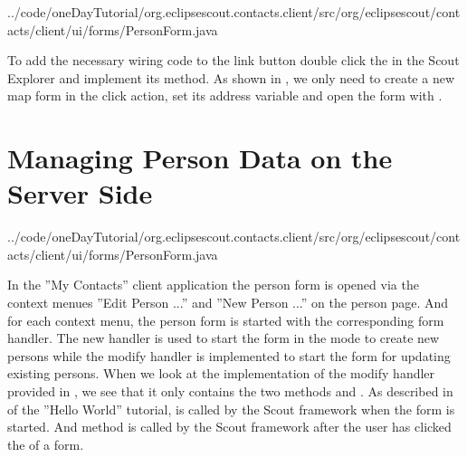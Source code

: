 \documentclass[a4paper,10pt,twoside]{book}
\begin{document}

{../code/oneDayTutorial/org.eclipsescout.contacts.client/src/org/eclipsescout/contacts/client/ui/forms/PersonForm.java}

To add the necessary wiring code to the link button double click the  in the Scout Explorer and implement its  method.
As shown in , we only need to create a new map form in the click action, set its address variable and open the form with .

\section{Managing Person Data on the Server Side}


{../code/oneDayTutorial/org.eclipsescout.contacts.client/src/org/eclipsescout/contacts/client/ui/forms/PersonForm.java}

In the ''My Contacts'' client application the person form is opened via the context menues ''Edit Person ...'' and ''New Person ...'' on the person page. 
And for each context menu, the person form is started with the corresponding form handler. 
The new handler is used to start the form in the mode to create new persons while the modify handler is implemented to start the form for updating existing persons. 
When we look at the implementation of the modify handler provided in , we see that it only contains the two methods  and . 
As described in  of the ''Hello World'' tutorial,  is called by the Scout framework when the form is started. 
And method  is called by the Scout framework after the user has clicked the  of a form. 
\end{document}
